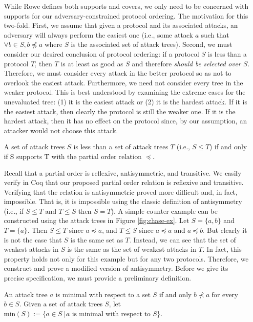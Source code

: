 \documentclass[runningheads]{llncs}
\theoremstyle{definition}
\begin{document}
While Rowe defines both supports and covers, we only need to be concerned with supports for our adversary-constrained protocol ordering. The motivation for this two-fold. First, we assume that given a protocol and its associated attacks, an adversary will always perform the easiest one (i.e., some attack $a$ such that $\forall b \in S, b \npreceq a$ where $S$ is the associated set of attack trees). Second, we must consider our desired conclusion of protocol ordering: if a protocol $S$ is less than a protocol $T$, then $T$ is at least as good as $S$ and therefore \emph{should be selected over $S$}. Therefore, we must consider every attack in the better protocol so as not to overlook the easiest attack. Furthermore, we need not consider every tree in the weaker protocol. This is best understood by examining the extreme cases for the unevaluated tree: (1) it is the easiest attack or (2) it is the hardest attack. If it is the easiest attack, then clearly the protocol is still the weaker one. If it is the hardest attack, then it has no effect on the protocol since, by our assumption, an attacker would not choose this attack.

\begin{definition}
  A set of attack trees $S$ is less than a set of attack trees $T$ (i.e., $S \leq T$) if and only if S supports T with the partial order relation $\preceq$.
\end{definition} 

Recall that a partial order is reflexive, antisymmetric, and transitive. We easily verify in Coq that our proposed partial order relation is reflexive and transitive. Verifying that the relation is antisymmetric proved more difficult and, in fact, impossible. That is, it is impossible using the classic definition of antisymmetry (i.e., if $S \le T$ and $T \le S$ then $S = T$). A simple counter example can be constructed using the attack trees in Figure \ref{fig:chase-ex}. Let $S = \{a,b\}$ and $T = \{a\}$. Then $S \le T$ since $a \preceq a$, and $T \le S$ since $a \preceq a$ and $a \preceq b$. But clearly it is not the case that $S$ is the same set as $T$. Instead, we can see that the set of weakest attacks in $S$ is the same as the set of weakest attacks in $T$. In fact, this property holds not only for this example but for any two protocols. Therefore, we construct and prove a modified version of antisymmetry. Before we give its precise specification, we must provide a preliminary definition.

\begin{definition}
  An attack tree $a$ is minimal with respect to a set $S$ if and only $b \nprec a$ for every $b \in S$. Given a set of attack trees $S$, let $\text{min}(S) := \{a \in S \,|\, a \text{ is minimal with respect to } S \}$.
\end{definition}
\end{document}
